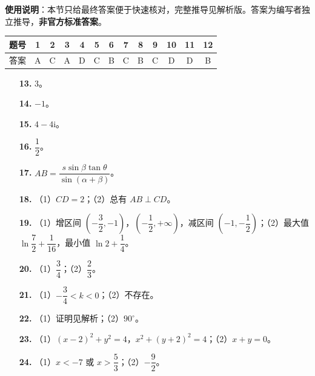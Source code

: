 
\begin{gknotice}
\textbf{使用说明}：本节只给最终答案便于快速核对，完整推导见解析版。答案为编写者独立推导，\textbf{非官方标准答案}。
\end{gknotice}

\begin{center}\begin{tabular}{ccccccccccccc}
\toprule
题号 & 1 & 2 & 3 & 4 & 5 & 6 & 7 & 8 & 9 & 10 & 11 & 12 \\
\midrule
答案 & A & C & A & D & C & B & C & B & C & D & D & B \\
\bottomrule
\end{tabular}\end{center}

\begin{itemize}[leftmargin=2.6em]
  \item[\textbf{13.}] $3$。
  \item[\textbf{14.}] $-1$。
  \item[\textbf{15.}] $4-4\mathrm i$。
  \item[\textbf{16.}] $\dfrac12$。
\end{itemize}

\begin{itemize}[leftmargin=2.6em]
  \item[\textbf{17.}] $AB=\dfrac{s\sin\beta\tan\theta}{\sin(\alpha+\beta)}$。
  \item[\textbf{18.}] （1）$CD=2$；（2）总有 $AB\perp CD$。
  \item[\textbf{19.}] （1）增区间 $\left(-\dfrac32,-1\right)$，$\left(-\dfrac12,+\infty\right)$，减区间 $\left(-1,-\dfrac12\right)$；（2）最大值 $\ln\dfrac72+\dfrac1{16}$，最小值 $\ln2+\dfrac14$。
  \item[\textbf{20.}] （1）$\dfrac34$；（2）$\dfrac23$。
  \item[\textbf{21.}] （1）$-\dfrac34<k<0$；（2）不存在。
  \item[\textbf{22.}] （1）证明见解析；（2）$90^\circ$。
\end{itemize}

\begin{itemize}[leftmargin=2.6em]
  \item[\textbf{23.}] （1）$(x-2)^2+y^2=4$，$x^2+(y+2)^2=4$；（2）$x+y=0$。
  \item[\textbf{24.}] （1）$x<-7$ 或 $x>\dfrac53$；（2）$-\dfrac92$。
\end{itemize}
